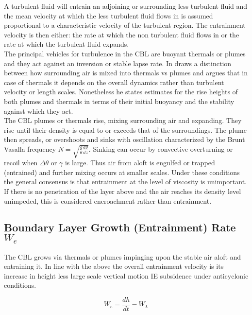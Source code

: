 A turbulent fluid will entrain an adjoining or surrounding less turbulent fluid and the mean velocity at which the less turbulent fluid flows in is assumed proportional to a characteristic velocity of the turbulent region.  The entrainment velocity is then either: the rate at which the non turbulent fluid flows in or the rate at which the turbulent fluid expands.\\   

The principal vehicles for turbulence in the CBL are buoyant thermals or plumes and they act against an inversion or stable lapse rate. In \cite{Turner86} \citeauthor{Turner86} draws a distinction between how surrounding air is mixed into thermals vs plumes and argues that in case of thermals it depends on the overall dynamics rather than turbulent velocity or length scales. Nonetheless he states estimates for the rise heights of both plumes and thermals in terms of their initial buoyancy and the stability against which they act.\\ 

The CBL plumes or thermals rise, mixing surrounding air and expanding. They rise until their density is equal to or exceeds that of the surroundings. The plume then spreads, or overshoots and sinks with oscillation characterized by the Brunt Vasalla frequency $N = \sqrt{\frac{g}{\theta} \frac{d\theta}{dz}}$. Sinking can occur by convective overturning or recoil when $\Delta \theta$ or $\gamma$ is large.  Thus air from aloft is engulfed or trapped (entrained) and further mixing occurs at smaller scales.  Under these conditions the general consensus is that entrainment at the level of viscosity is unimportant. If there is no penetration of the layer above and the air reaches its density level unimpeded, this is considered encroachment rather than entrainment.\\ 
\cite{Turner86}

\subsection{Boundary Layer Growth (Entrainment) Rate $W_{e}$}
\label{subsec:BoundaryLayerGrowth}

The CBL grows via thermals or plumes impinging upon the stable air aloft and entraining it. In line with the above the overall entrainment velocity  is its increase in height less large scale vertical motion IE subsidence under anticyclonic conditions.

\begin{equation}
W_{e} = \frac{dh}{dt} - W_{L}  
\end{equation}

